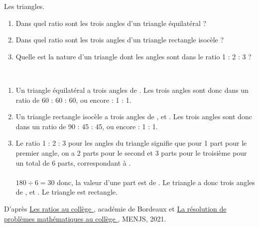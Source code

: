 \begin{colonne*exercice}
\bigskip


\begin{exercice}
   Les triangles.
   \begin{enumerate}
      \item Dans quel ratio sont les trois angles d’un triangle équilatéral ?
      \item Dans quel ratio sont les trois angles d’un triangle rectangle isocèle ?
      \item Quelle est la nature d’un triangle dont les angles sont dans le ratio 1 : 2 : 3 ?
   \end{enumerate}
\end{exercice}

\begin{corrige}
\ \\ [-5mm]
   \begin{enumerate}
      \item Un triangle équilatéral a trois angles de . Les trois angles sont donc dans un ratio de 60 : 60 : 60, ou encore { : 1 : 1}.
      \item Un triangle rectangle isocèle a trois angles de ,  et . Les trois angles sont donc dans un ratio de 90 : 45 : 45, ou encore { : 1 : 1}.
      \item Le ratio 1 : 2 : 3 pour les angles du triangle signifie que pour 1 part pour le premier angle, on a 2 parts pour le second et 3 parts pour le troisième pour un total de 6 parts, correspondant à . \\ [2mm]
            \quad {} \\
         $180\div6 =30$ donc, la valeur d'une part est de . Le triangle a donc trois angles de ,  et .
         {\blue Le triangle est rectangle.} 
   \end{enumerate}
\end{corrige}

\end{colonne*exercice}

\vfill\hfill{\footnotesize D'après \href{https://ent2d.ac-bordeaux.fr/disciplines/mathematiques/les-ratios-au-college/}{\og Les ratios au collège \fg}, académie de Bordeaux et \href{https://eduscol.education.fr/document/13132/download}{\og La résolution de problèmes mathématiques au collège \fg}, MENJS, 2021.}


\Recreation

